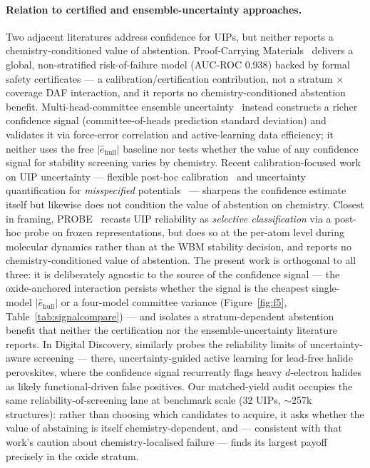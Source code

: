 \documentclass[aip,jcp,preprint,superscriptaddress,amsmath,amssymb]{revtex4-2}
\begin{document}
\paragraph{Relation to certified and ensemble-uncertainty approaches.} Two adjacent
literatures address confidence for UIPs, but neither reports a chemistry-conditioned value of
abstention. Proof-Carrying Materials~\citep{pcm2026} delivers a global, non-stratified
risk-of-failure model (AUC-ROC $0.938$) backed by formal safety certificates --- a
calibration/certification contribution, not a stratum $\times$ coverage DAF interaction, and
it reports no chemistry-conditioned abstention benefit. Multi-head-committee ensemble
uncertainty~\citep{beck2025} instead constructs a richer confidence signal (committee-of-heads
prediction standard deviation) and validates it via force-error correlation and
active-learning data efficiency; it neither uses the free $|\hat{e}_{\mathrm{hull}}|$ baseline
nor tests whether the value of any confidence signal for stability screening varies by
chemistry. Recent calibration-focused work on UIP uncertainty --- flexible post-hoc
calibration~\citep{ho2026flexcalib} and uncertainty quantification for \emph{misspecified}
potentials~\citep{perez2025uqmisspec} --- sharpens the confidence estimate itself but likewise
does not condition the value of abstention on chemistry. Closest in framing,
PROBE~\citep{probe2026} recasts UIP reliability as
\emph{selective classification} via a post-hoc probe on frozen representations, but does so at
the per-atom level during molecular dynamics rather than at the WBM stability decision, and
reports no chemistry-conditioned value of abstention. The present work is orthogonal to all
three: it is deliberately agnostic to the source
of the confidence signal --- the oxide-anchored interaction persists whether the signal is the
cheapest single-model $|\hat{e}_{\mathrm{hull}}|$ or a four-model committee variance
(Figure~\ref{fig:f5}, Table~\ref{tab:signalcompare}) --- and isolates a stratum-dependent
abstention benefit that neither the certification nor the ensemble-uncertainty literature
reports. In Digital Discovery, \citet{yu2026uaal} similarly probes the reliability limits of
uncertainty-aware screening --- there, uncertainty-guided active learning for lead-free halide
perovskites, where the confidence signal recurrently flags heavy $d$-electron halides as likely
functional-driven false positives. Our matched-yield audit occupies the same
reliability-of-screening lane at benchmark scale ($32$ UIPs, $\sim$257k structures): rather than
choosing which candidates to acquire, it asks whether the value of abstaining is itself
chemistry-dependent, and --- consistent with that work's caution about chemistry-localised
failure --- finds its largest payoff precisely in the oxide stratum.
\end{document}
